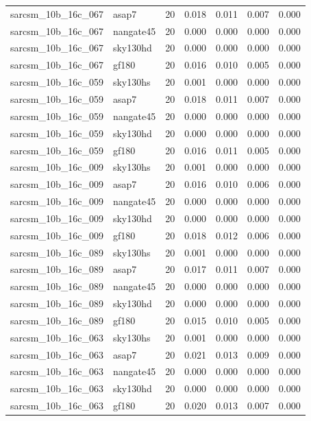 \begin{tabular}{llrrrrr}
sarcsm\_10b\_16c\_067 & asap7 & 20 & 0.018 & 0.011 & 0.007 & 0.000 \\
sarcsm\_10b\_16c\_067 & nangate45 & 20 & 0.000 & 0.000 & 0.000 & 0.000 \\
sarcsm\_10b\_16c\_067 & sky130hd & 20 & 0.000 & 0.000 & 0.000 & 0.000 \\
sarcsm\_10b\_16c\_067 & gf180 & 20 & 0.016 & 0.010 & 0.005 & 0.000 \\
sarcsm\_10b\_16c\_059 & sky130hs & 20 & 0.001 & 0.000 & 0.000 & 0.000 \\
sarcsm\_10b\_16c\_059 & asap7 & 20 & 0.018 & 0.011 & 0.007 & 0.000 \\
sarcsm\_10b\_16c\_059 & nangate45 & 20 & 0.000 & 0.000 & 0.000 & 0.000 \\
sarcsm\_10b\_16c\_059 & sky130hd & 20 & 0.000 & 0.000 & 0.000 & 0.000 \\
sarcsm\_10b\_16c\_059 & gf180 & 20 & 0.016 & 0.011 & 0.005 & 0.000 \\
sarcsm\_10b\_16c\_009 & sky130hs & 20 & 0.001 & 0.000 & 0.000 & 0.000 \\
sarcsm\_10b\_16c\_009 & asap7 & 20 & 0.016 & 0.010 & 0.006 & 0.000 \\
sarcsm\_10b\_16c\_009 & nangate45 & 20 & 0.000 & 0.000 & 0.000 & 0.000 \\
sarcsm\_10b\_16c\_009 & sky130hd & 20 & 0.000 & 0.000 & 0.000 & 0.000 \\
sarcsm\_10b\_16c\_009 & gf180 & 20 & 0.018 & 0.012 & 0.006 & 0.000 \\
sarcsm\_10b\_16c\_089 & sky130hs & 20 & 0.001 & 0.000 & 0.000 & 0.000 \\
sarcsm\_10b\_16c\_089 & asap7 & 20 & 0.017 & 0.011 & 0.007 & 0.000 \\
sarcsm\_10b\_16c\_089 & nangate45 & 20 & 0.000 & 0.000 & 0.000 & 0.000 \\
sarcsm\_10b\_16c\_089 & sky130hd & 20 & 0.000 & 0.000 & 0.000 & 0.000 \\
sarcsm\_10b\_16c\_089 & gf180 & 20 & 0.015 & 0.010 & 0.005 & 0.000 \\
sarcsm\_10b\_16c\_063 & sky130hs & 20 & 0.001 & 0.000 & 0.000 & 0.000 \\
sarcsm\_10b\_16c\_063 & asap7 & 20 & 0.021 & 0.013 & 0.009 & 0.000 \\
sarcsm\_10b\_16c\_063 & nangate45 & 20 & 0.000 & 0.000 & 0.000 & 0.000 \\
sarcsm\_10b\_16c\_063 & sky130hd & 20 & 0.000 & 0.000 & 0.000 & 0.000 \\
sarcsm\_10b\_16c\_063 & gf180 & 20 & 0.020 & 0.013 & 0.007 & 0.000 \\

\end{tabular}
